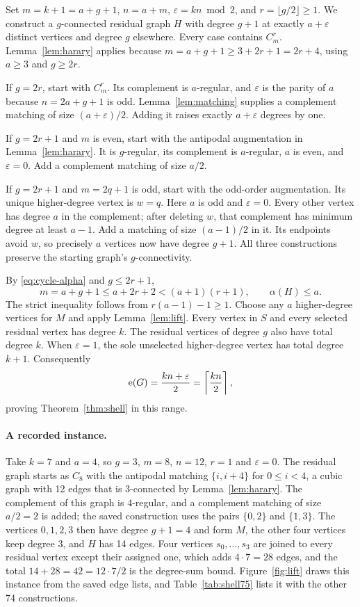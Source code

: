 Set $m=k+1=a+g+1$, $n=a+m$, $\varepsilon=kn\bmod2$, and $r=\lfloor g/2\rfloor\ge1$.
We construct a $g$-connected residual graph $H$ with degree $g+1$ at exactly $a+\varepsilon$ distinct vertices and degree $g$ elsewhere.
Every case contains $C_m^r$.
Lemma~\ref{lem:harary} applies because $m=a+g+1\ge3+2r+1=2r+4$, using $a\ge3$ and $g\ge2r$.

If $g=2r$, start with $C_m^r$.
Its complement is $a$-regular, and $\varepsilon$ is the parity of $a$ because $n=2a+g+1$ is odd.
Lemma~\ref{lem:matching} supplies a complement matching of size $(a+\varepsilon)/2$.
Adding it raises exactly $a+\varepsilon$ degrees by one.

If $g=2r+1$ and $m$ is even, start with the antipodal augmentation in Lemma~\ref{lem:harary}.
It is $g$-regular, its complement is $a$-regular, $a$ is even, and $\varepsilon=0$.
Add a complement matching of size $a/2$.

If $g=2r+1$ and $m=2q+1$ is odd, start with the odd-order augmentation.
Its unique higher-degree vertex is $w=q$.
Here $a$ is odd and $\varepsilon=0$.
Every other vertex has degree $a$ in the complement; after deleting $w$, that complement has minimum degree at least $a-1$.
Add a matching of size $(a-1)/2$ in it.
Its endpoints avoid $w$, so precisely $a$ vertices now have degree $g+1$.
All three constructions preserve the starting graph's $g$-connectivity.

By \eqref{eq:cycle-alpha} and $g\le2r+1$,
\begin{equation}
m=a+g+1\le a+2r+2<(a+1)(r+1),\qquad \alpha(H)\le a.
\end{equation}
The strict inequality follows from $r(a-1)-1\ge1$.
Choose any $a$ higher-degree vertices for $M$ and apply Lemma~\ref{lem:lift}.
Every vertex in $S$ and every selected residual vertex has degree $k$.
The residual vertices of degree $g$ also have total degree $k$.
When $\varepsilon=1$, the sole unselected higher-degree vertex has total degree $k+1$.
Consequently
\begin{equation}
\mathrm{e}(G)=\frac{kn+\varepsilon}{2}=\left\lceil\frac{kn}{2}\right\rceil,
\end{equation}
proving Theorem~\ref{thm:shell} in this range.

\paragraph{A recorded instance.}
Take $k=7$ and $a=4$, so $g=3$, $m=8$, $n=12$, $r=1$ and $\varepsilon=0$.
The residual graph starts as $C_8$ with the antipodal matching $\{i,i+4\}$ for $0\le i<4$, a cubic graph with 12 edges that is $3$-connected by Lemma~\ref{lem:harary}.
The complement of this graph is $4$-regular, and a complement matching of size $a/2=2$ is added; the saved construction uses the pairs $\{0,2\}$ and $\{1,3\}$.
The vertices $0,1,2,3$ then have degree $g+1=4$ and form $M$, the other four vertices keep degree $3$, and $H$ has 14 edges.
Four vertices $s_0,\ldots,s_3$ are joined to every residual vertex except their assigned one, which adds $4\cdot7=28$ edges, and the total $14+28=42=12\cdot7/2$ is the degree-sum bound.
Figure~\ref{fig:lift} draws this instance from the saved edge lists, and Table~\ref{tab:shell75} lists it with the other 74 constructions.

